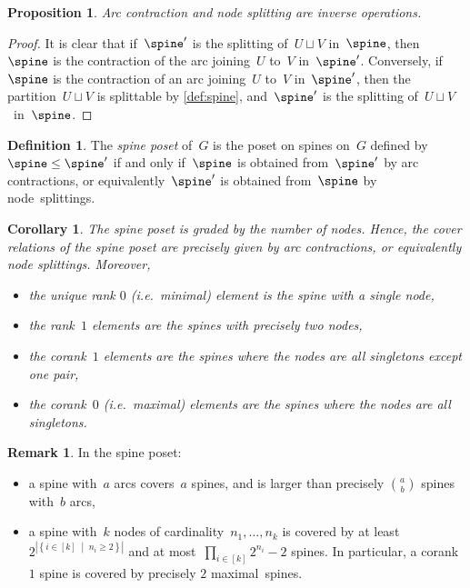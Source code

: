 \documentclass{amsart}
\newtheorem{corollary}[theorem]{Corollary}
\newtheorem{proposition}[theorem]{Proposition}
\theoremstyle{definition}
\newtheorem{definition}[theorem]{Definition}
\newtheorem{remark}[theorem]{Remark}
\newcommand{\set}[2]{\left\{ #1 \;\middle|\; #2 \right\}} %
\newcommand{\ie}{\textit{i.e.}~} %
\newcommand{\darkblue}{\color{darkblue}} %
\newcommand{\defn}[1]{\textsl{\darkblue #1}} %
\begin{document}
\begin{proposition}
  \label{prop:contractionSplitting}
  Arc contraction and node splitting are inverse operations.
\end{proposition}

\begin{proof}
  It is clear that if~$\spine'$ is the splitting of~$U \sqcup V$ in~$\spine$, then~$\spine$ is the contraction of the arc joining~$U$ to~$V$ in~$\spine'$.
  Conversely, if~$\spine$ is the contraction of an arc joining~$U$ to~$V$ in~$\spine'$, then the partition~$U \sqcup V$ is splittable by \cref{def:spine}, and~$\spine'$ is the splitting of~$U \sqcup V$~in~$\spine$.
\end{proof}

\begin{definition}
  The \defn{spine poset} of~$G$ is the poset on spines on~$G$ defined by~$\spine \le \spine'$ if and only if~$\spine$ is obtained from~$\spine'$ by arc contractions, or equivalently~$\spine'$ is obtained from~$\spine$ by node~splittings.
\end{definition}

\begin{corollary} 
  The spine poset is graded by the number of nodes.
  Hence, the cover relations of the spine poset are precisely given by arc contractions, or equivalently node splittings.
  Moreover,
  \begin{itemize}
    \item the unique rank $0$ (\ie minimal) element is the spine with a single node, 
    \item the rank~$1$ elements are the spines with precisely two nodes, 
    \item the corank~$1$ elements are the spines where the nodes are all singletons except one pair,
    \item the corank~$0$ (\ie maximal) elements are the spines where the nodes are all singletons.
  \end{itemize}
\end{corollary}

\begin{remark}
  In the spine poset:
  \begin{itemize}
    \item a spine with~$a$ arcs covers~$a$ spines, and is larger than precisely $\binom{a}{b}$ spines with~$b$ arcs,
    \item a spine with~$k$ nodes of cardinality~$n_1, \dots, n_k$ is covered by at least~$2^{|\set{i \in [k]}{n_i \ge 2}|}$ and at most~$\prod_{i \in [k]} 2^{n_i}-2$ spines. In particular, a corank~$1$ spine is covered by precisely $2$ maximal~spines.
  \end{itemize}
\end{remark}
\end{document}
